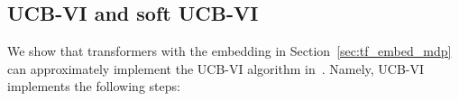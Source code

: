 








\subsection{UCB-VI and soft UCB-VI}\label{sec:example_ucbvi}
We show that transformers with the embedding in Section~\ref{sec:tf_embed_mdp}  can approximately implement the  UCB-VI algorithm in~\cite{azar2017minimax}. Namely, UCB-VI implements the following steps:


